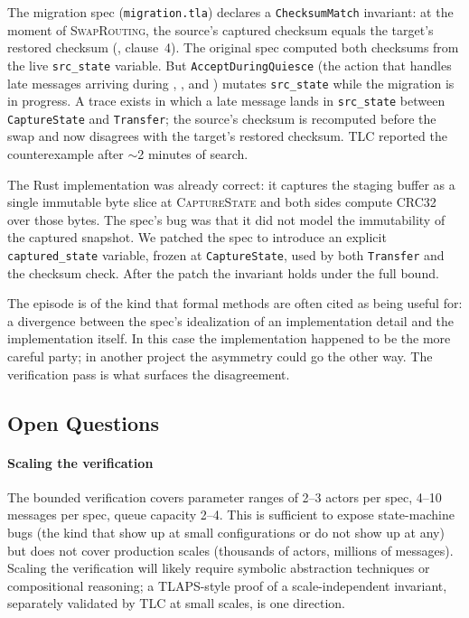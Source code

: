 The migration spec (\texttt{migration.tla}) declares a
\texttt{ChecksumMatch} invariant: at the moment of
\textsc{SwapRouting}, the source's captured checksum equals the
target's restored checksum (, clause~4).
The original spec computed both checksums from the live
\texttt{src\_state} variable.  But \texttt{AcceptDuringQuiesce}
(the action that handles late messages arriving during
, , and )
mutates \texttt{src\_state} while the migration is in progress.
A trace exists in which a late message lands in
\texttt{src\_state} between \texttt{CaptureState} and
\texttt{Transfer}; the source's checksum is recomputed before the
swap and now disagrees with the target's restored checksum.  TLC
reported the counterexample after $\sim$2 minutes of search.

The Rust implementation was already correct: it captures the
staging buffer as a single immutable byte slice at
\textsc{CaptureState} and both sides compute CRC32 over those
bytes.  The spec's bug was that it did not model the immutability
of the captured snapshot.  We patched the spec to introduce an
explicit \texttt{captured\_state} variable, frozen at
\texttt{CaptureState}, used by both \texttt{Transfer} and the
checksum check.  After the patch the invariant holds under the
full bound.

The episode is of the kind that formal methods are often cited as
being useful for: a divergence between the spec's idealization of
an implementation detail and the implementation itself.  In this
case the implementation happened to be the more careful party; in
another project the asymmetry could go the other way.  The
verification pass is what surfaces the disagreement.

\subsection{Open Questions}
\label{sec:disc:open}

\paragraph{Scaling the verification}
The bounded \TLA{} verification covers parameter ranges of 2--3
actors per spec, 4--10 messages per spec, queue capacity 2--4.  This
is sufficient to expose state-machine bugs (the kind that show up at
small configurations or do not show up at any) but does not cover
production scales (thousands of actors, millions of messages).
Scaling the verification will likely require symbolic abstraction
techniques or compositional reasoning; a TLAPS-style proof of a
scale-independent invariant, separately validated by TLC at small
scales, is one direction.

